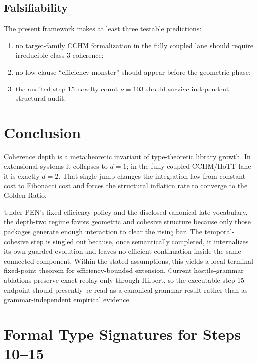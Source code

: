 \documentclass[11pt,a4paper]{article}
\theoremstyle{plain}
\theoremstyle{definition}
\theoremstyle{remark}
\begin{document}
\subsection{Falsifiability}

The present framework makes at least three testable predictions:
\begin{enumerate}[nosep]
    \item no target-family CCHM formalization in the fully coupled lane should require irreducible class-$3$ coherence;
    \item no low-clause ``efficiency monster'' should appear before the geometric phase;
    \item the audited step-15 novelty count $\nu=103$ should survive independent structural audit.
\end{enumerate}

\section{Conclusion}
\label{sec:conclusion}

Coherence depth is a metatheoretic invariant of type-theoretic library growth.  In extensional systems it collapses to $d=1$; in the fully coupled CCHM/HoTT lane it is exactly $d=2$.  That single jump changes the integration law from constant cost to Fibonacci cost and forces the structural inflation rate to converge to the Golden Ratio.

Under PEN's fixed efficiency policy and the disclosed canonical late vocabulary, the depth-two regime favors geometric and cohesive structure because only those packages generate enough interaction to clear the rising bar.  The temporal-cohesive step is singled out because, once semantically completed, it internalizes its own guarded evolution and leaves no efficient continuation inside the same connected component.  Within the stated assumptions, this yields a local terminal fixed-point theorem for efficiency-bounded extension.  Current hostile-grammar ablations preserve exact replay only through Hilbert, so the executable step-15 endpoint should presently be read as a canonical-grammar result rather than as grammar-independent empirical evidence.

\appendix

\section{Formal Type Signatures for Steps 10--15}
\label{app:signatures}
\end{document}
